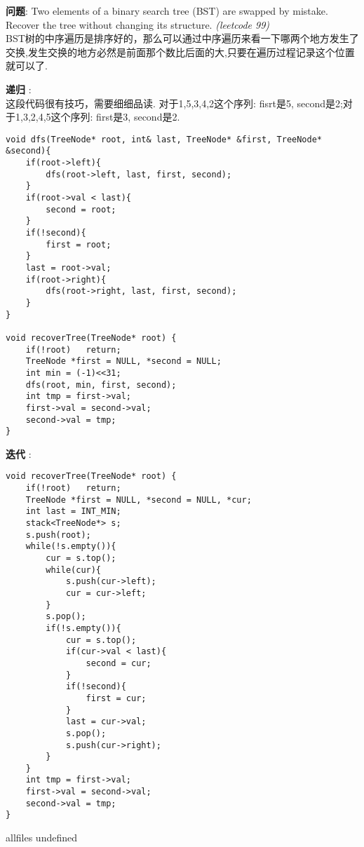 \documentclass{article}
\begin{document}
\begin{CJK}{UTF8}{gbsn}     %

\else
	
\begin{description}
	\item{\textbf{问题}}: Two elements of a binary search tree (BST) are swapped by mistake. Recover the tree without changing its structure. \textit{(leetcode 99)}
	\\BST树的中序遍历是排序好的，那么可以通过中序遍历来看一下哪两个地方发生了交换,发生交换的地方必然是前面那个数比后面的大,只要在遍历过程记录这个位置就可以了.
	\item{\textbf{递归}} : 
	\\这段代码很有技巧，需要细细品读. 对于1,5,3,4,2这个序列: fisrt是5, second是2;对于1,3,2,4,5这个序列: first是3, second是2.
	\begin{lstlisting}
void dfs(TreeNode* root, int& last, TreeNode* &first, TreeNode* &second){
	if(root->left){
		dfs(root->left, last, first, second);
	}
	if(root->val < last){
		second = root;
	}
	if(!second){
		first = root;
	}
	last = root->val;
	if(root->right){
		dfs(root->right, last, first, second);
	}
}

void recoverTree(TreeNode* root) {
	if(!root)	return;
	TreeNode *first = NULL, *second = NULL;
	int min = (-1)<<31;
	dfs(root, min, first, second);
	int tmp = first->val;
	first->val = second->val;
	second->val = tmp;
}
	\end{lstlisting}
	\item{\textbf{迭代}} : 
	\begin{lstlisting}
void recoverTree(TreeNode* root) {
	if(!root)	return;
	TreeNode *first = NULL, *second = NULL, *cur;
	int last = INT_MIN;
	stack<TreeNode*> s;
	s.push(root);
	while(!s.empty()){
		cur = s.top();
		while(cur){
			s.push(cur->left);
			cur = cur->left;
		}
		s.pop();
		if(!s.empty()){
			cur = s.top();
			if(cur->val < last){
				second = cur;
			}
			if(!second){
				first = cur;
			}
			last = cur->val;
			s.pop();
			s.push(cur->right);
		}
	}
	int tmp = first->val;
	first->val = second->val;
	second->val = tmp;
}
	\end{lstlisting}
\end{description}

\fi

\ifx allfiles undefined
\end{CJK}
\end{document}
